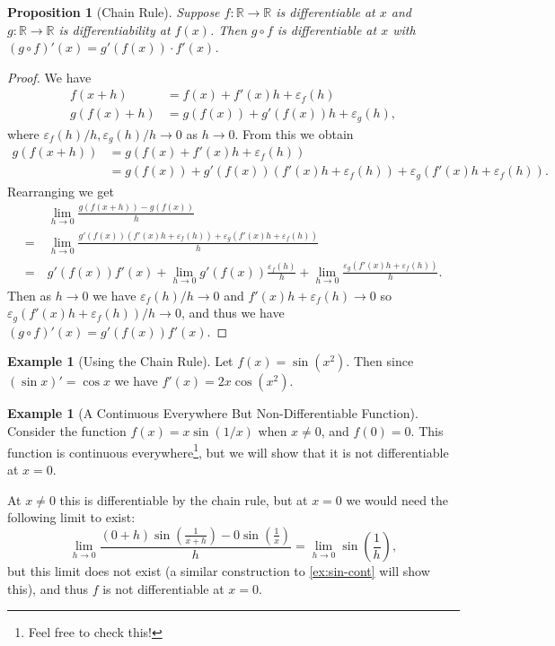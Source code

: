 \documentclass[11pt, a4paper]{article}
\newtheorem{proposition}[theorem]{Proposition}
\theoremstyle{definition}
\newtheorem{example}[theorem]{Example}
\newcommand{\R}{\mathbb{R}}
\begin{document}
\begin{proposition}[Chain Rule]
	Suppose $f: \R \rightarrow \R$ is differentiable at $x$ and $g: \R \rightarrow \R$ is differentiability at $f(x)$. Then $g \circ f$ is differentiable at $x$ with $(g \circ f)'(x) = g'(f(x)) \cdot f'(x)$.
\end{proposition}
\begin{proof}
	We have
	\begin{align*}
	f(x + h) &= f(x) + f'(x)h + \varepsilon_f(h) \\
		g(f(x) + h) &= g(f(x)) + g'(f(x)) h + \varepsilon_g(h),
	\end{align*}
	where $\varepsilon_f(h)/h, \varepsilon_g(h)/h \rightarrow 0$ as $h \rightarrow 0$. From this we obtain
	\begin{align*}
		g(f(x + h)) &= g(f(x) + f'(x)h + \varepsilon_f(h)) \\
		&= g(f(x)) + g'(f(x))(f'(x)h + \varepsilon_f(h)) + \varepsilon_g(f'(x)h + \varepsilon_f(h)).
	\end{align*}
	Rearranging we get
	\begin{align*}
		&\lim_{h \to 0}\frac{g(f(x + h)) - g(f(x))}{h}\\
		=\ &\lim_{h \to 0} \frac{g'(f(x))(f'(x)h + \varepsilon_f(h)) + \varepsilon_g(f'(x)h + \varepsilon_f(h))}{h} \\
		=\ &g'(f(x))f'(x) +  \lim_{h \to 0}g'(f(x)) \frac{\varepsilon_f(h)}{h} +\lim_{h \to 0}\frac{\varepsilon_g(f'(x)h + \varepsilon_f(h))}{h}.
	\end{align*}
	Then as $h \rightarrow 0$ we have $\varepsilon_f (h)/h \rightarrow 0$ and $f'(x)h + \varepsilon_f(h) \rightarrow 0$ so $\varepsilon_g(f'(x)h + \varepsilon_f(h))/h \rightarrow 0$, and thus we have
	$
	(g \circ f)'(x) = g'(f(x))f'(x).
	$
\end{proof}



\begin{example}[Using the Chain Rule]
	Let $f(x) = \sin(x^2)$. Then since $(\sin x)' = \cos x$ we have $f'(x) = 2x \cos (x^2)$.
\end{example}
\begin{example}[A Continuous Everywhere But Non-Differentiable Function]
	Consider the function $f(x) = x \sin(1/x)$ when $x \neq 0$, and $f(0) = 0$. This function is continuous everywhere\footnote{Feel free to check this!}, but we will show that it is not differentiable at $x = 0$.

	At $x \neq 0$ this is differentiable by the chain rule, but at $x = 0$ we would need the following limit to exist:
	$$
	\lim_{h \to 0} \frac{(0 + h)\sin\left(\frac{1}{x + h}\right) - 0\sin\left(\frac{1}{x}\right)}{h} = \lim_{h \to 0} \sin\left(\frac{1}{h}\right),
	$$
	but this limit does not exist (a similar construction to \autoref{ex:sin-cont} will show this), and thus $f$ is not differentiable at $x = 0$.
\end{example}
\end{document}
